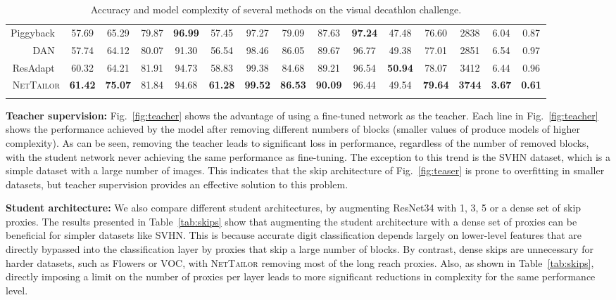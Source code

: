\documentclass[10pt,twocolumn,letterpaper]{article}
\begin{document}
\begin{table*}[t!]
{\begin{tabular}{r|cccccccccc|cccc}
Piggyback~\cite{mallya2018piggyback} & 57.69 & 65.29 & 79.87 & \bf 96.99 & 57.45 & 97.27 & 79.09 & 87.63 & \bf 97.24 & 47.48 & 76.60 & 2838 & 6.04 & 0.87 \\
DAN~\cite{rosenfeld2018incremental} & 57.74 & 64.12 & 80.07 &  91.30 & 56.54 & 98.46 & 86.05 & 89.67 & 96.77 &  49.38 & 77.01 & 2851 & 6.54 & 0.97 \\
ResAdapt~\cite{rebuffi2018efficient} & 60.32 & 64.21 & 81.91 & 94.73 & 58.83 & 99.38 & 84.68 & 89.21 & 96.54 & \bf 50.94 & 78.07 & 3412 & 6.44 & 0.96 \\
\midrule
\textsc{NetTailor} & \bf 61.42 & \bf 75.07 & 81.84 & 94.68 & \bf 61.28 & \bf 99.52 & \bf 86.53 & \bf 90.09 & 96.44 & 49.54 & \bf 79.64 & \bf 3744 & \bf 3.67 & \bf 0.61 \\
\rowcolor{white}
\bottomrule
\end{tabular}
}
\caption{Accuracy and model complexity of several methods on the visual decathlon challenge. }
\label{tab:decathlon}
\end{table*}
%
 
\noindent
\textbf{Teacher supervision:}
Fig.~\ref{fig:teacher} shows the advantage of using a fine-tuned network as the teacher.
Each line in Fig.~\ref{fig:teacher} shows the performance achieved by the model after removing different numbers of blocks  (smaller values of  produce models of higher complexity).
As can be seen, removing the teacher leads to significant loss in performance, regardless of the number of removed blocks, with the student network never achieving the same performance as fine-tuning.
The exception to this trend is the SVHN dataset, which is a simple dataset with a large number of images. This indicates that the skip architecture of Fig.~\ref{fig:teaser} is prone to overfitting in smaller datasets, but teacher supervision provides an effective solution to this problem.

\noindent
\textbf{Student architecture:}
We also compare different student architectures, by augmenting ResNet34 with 1, 3, 5 or a dense set of skip proxies.
The results presented in Table~\ref{tab:skips} show that augmenting the student architecture with a dense set of proxies can be beneficial for simpler datasets like SVHN. This is because accurate digit classification depends largely on lower-level features that are directly bypassed into the classification layer by proxies that skip a large number of blocks.
By contrast, dense skips are unnecessary for harder datasets, such as Flowers or VOC, with \textsc{NetTailor} removing most of the long reach proxies.
Also, as shown in Table~\ref{tab:skips}, directly imposing a limit on the number of proxies per layer leads to more significant reductions in complexity for the same performance level.
\end{document}
